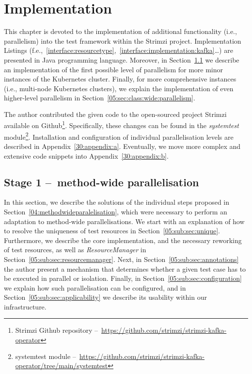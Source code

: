 \chapter{Implementation}
\label{05:chapter:title}

This chapter is devoted to the implementation of additional functionality (i.e., parallelism) into the test framework within the Strimzi project.
Implementation Listings (f.e.,~\ref{interface:resourcetype},~\ref{interface:implementation:kafka}\dots) are presented in Java programming language.
Moreover, in Section~\ref{05:sec:method:wide:parallelism} we describe an implementation of the first possible level of
parallelism for more minor instances of the Kubernetes cluster.
Finally, for more comprehensive instances (i.e., multi-node Kubernetes clusters),
we explain the implementation of even higher-level parallelism in Section~\ref{05:sec:class:wide:parallelism}.

The author contributed the given code to the open-sourced project Strimzi available on
Github\footnote{Strimzi Github repository \---\ \url{https://github.com/strimzi/strimzi-kafka-operator}}.
Specifically, these changes can be found in the \emph{systemtest} module\footnote{systemtest module \---\ \url{https://github.com/strimzi/strimzi-kafka-operator/tree/main/systemtest}}.
Installation and configuration of individual parallelisation levels are described in Appendix~\ref{30:appendix:a}.
Eventually, we move more complex and extensive code snippets into Appendix~\ref{30:appendix:b}.

\section{Stage 1 \---\ method-wide parallelisation}
\label{05:sec:method:wide:parallelism}

In this section, we describe the solutions of the individual steps proposed in Section~\ref{04:methodwideparalelisation},
which were necessary to perform an adaptation to method-wide parallelisations.
We start with an explanation of how to resolve the uniqueness of test resources in Section~\ref{05:sub:sec:unique}.
Furthermore, we describe the core implementation, and the necessary reworking of test resources, as well as \emph{ResourceManager} in Section~\ref{05:sub:sec:resourcemanager}.
Next, in Section~\ref{05:sub:sec:annotations} the author present a mechanism that determines whether a given test case has to be executed in parallel or isolation.
Finally, in Section~\ref{05:sub:sec:configuration} we explain how such parallelisation can be configured,
and in Section~\ref{05:sub:sec:applicability} we describe its usability within our infrastructure.

